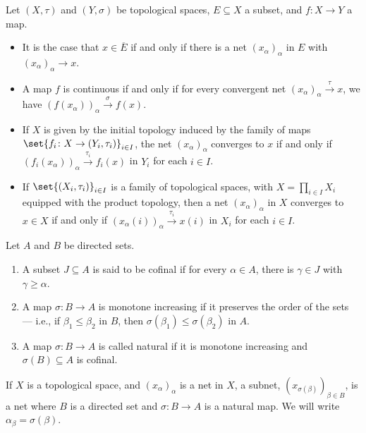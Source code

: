 \begin{fact}
  Let $\left(X,\tau\right)$ and $\left(Y,\sigma\right)$ be topological spaces, $E\subseteq X$ a subset, and $f\colon X\rightarrow Y$ a map.
  \begin{itemize}
    \item It is the case that $x\in \overline{E}$ if and only if there is a net $\left(x_{\alpha}\right)_{\alpha}$ in $E$ with $\left(x_{\alpha}\right)_{\alpha}\rightarrow x$.
    \item A map $f$ is continuous if and only if for every convergent net $\left(x_{\alpha}\right)_{\alpha}\xrightarrow{\tau}x$, we have $\left(f\left(x_{\alpha}\right)\right)_{\alpha}\xrightarrow{\sigma}f(x)$.
    \item If $X$ is given by the initial topology induced by the family of maps $\set{f_i\colon X\rightarrow \left(Y_i,\tau_i\right)}_{i\in I}$, the net $\left(x_{\alpha}\right)_{\alpha}$ converges to $x$ if and only if $\left(f_i\left(x_{\alpha}\right)\right)_{\alpha}\xrightarrow{\tau_i}f_i\left(x\right)$ in $Y_i$ for each $i\in I$.
    \item If $\set{\left(X_i,\tau_i\right)}_{i\in I}$ is a family of topological spaces, with $X = \prod_{i\in I}X_i$ equipped with the product topology, then a net $\left(x_{\alpha}\right)_{\alpha}$ in $X$ converges to $x\in X$ if and only if $\left(x_{\alpha}\left(i\right)\right)_{\alpha}\xrightarrow{\tau_i} x\left(i\right)$ in $X_i$ for each $i\in I$.
  \end{itemize}
\end{fact}
\begin{definition}
  Let $A$ and $B$ be directed sets.
  \begin{enumerate}[(1)]
    \item A subset $J\subseteq A$ is said to be cofinal if for every $\alpha \in A$, there is $\gamma\in J$ with $\gamma \geq \alpha$.
    \item A map $\sigma\colon B\rightarrow A$ is monotone increasing if it preserves the order of the sets --- i.e., if $\beta_1\leq \beta_2$ in $B$, then $\sigma\left(\beta_1\right) \leq \sigma\left(\beta_2\right)$ in $A$.
    \item A map $\sigma\colon B\rightarrow A$ is called natural if it is monotone increasing and $\sigma\left(B\right)\subseteq A$ is cofinal.
  \end{enumerate}
  If $X$ is a topological space, and $\left(x_{\alpha}\right)_{\alpha}$ is a net in $X$, a subnet, $\left(x_{\sigma\left(\beta\right)}\right)_{\beta\in B}$, is a net where $B$ is a directed set and $\sigma\colon B\rightarrow A$ is a natural map. We will write $\alpha_{\beta} = \sigma\left(\beta\right)$.
\end{definition}
